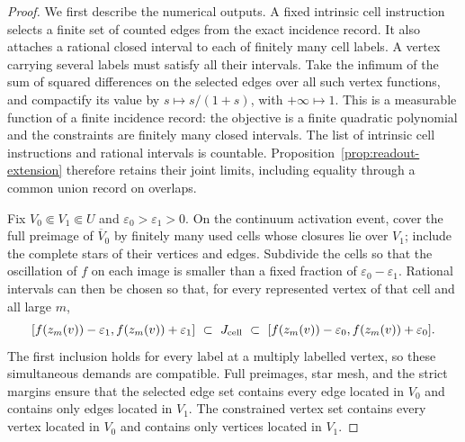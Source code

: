 \begin{proof}
We first describe the numerical outputs.  A fixed intrinsic cell instruction
selects a finite set of counted edges from the exact incidence record.  It
also attaches a rational closed interval to each of finitely many cell
labels.  A vertex carrying several labels must satisfy all their intervals.
Take the infimum of the sum of squared differences on the selected edges
over all such vertex functions, and compactify its value by
\(s\mapsto s/(1+s)\), with \(+\infty\mapsto1\).  This is a measurable
function of a finite incidence record: the objective is a finite quadratic
polynomial and the constraints are finitely many closed intervals.  The
list of intrinsic cell instructions and rational intervals is countable.
Proposition~\ref{prop:readout-extension} therefore retains their joint
limits, including equality through a common union record on overlaps.

Fix \(V_0\Subset V_1\Subset U\) and
\(\varepsilon_0>\varepsilon_1>0\).  On the continuum activation event,
cover the full preimage of \(\overline V_0\) by finitely many used cells
whose closures lie over \(V_1\); include the complete stars of their
vertices and edges.  Subdivide the cells so that the oscillation of \(f\)
on each image is smaller than a fixed fraction of
\(\varepsilon_0-\varepsilon_1\).  Rational intervals can then be chosen
so that, for every represented vertex of that cell and all large \(m\),
\begin{equation}\label{eq:value-interval-sandwich}
 [f(z_m(v))-\varepsilon_1,f(z_m(v))+\varepsilon_1]
 \ \subset\ J_{\rm cell}\
 \subset\
 [f(z_m(v))-\varepsilon_0,f(z_m(v))+\varepsilon_0].
\end{equation}
The first inclusion holds for every label at a multiply labelled vertex,
so these simultaneous demands are compatible.  Full preimages, star mesh,
and the strict margins ensure that the selected edge set contains every
edge located in \(V_0\) and contains only edges located in \(V_1\).
The constrained vertex set contains every vertex located in \(V_0\) and
contains only vertices located in \(V_1\).


\end{proof}
